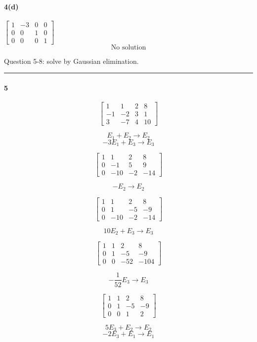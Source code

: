 \documentclass[a4paper,11pt,twoside]{report}
\begin{document}
\paragraph{4(d)}
$\begin{bmatrix}  1 & -3 & 0 & 0 \\ 0 & 0 & 1 & 0 \\ 0 & 0 & 0 & 1  \end{bmatrix} $
\[\boxed{\:\text{No solution}\:}\]

\noindent Question 5-8: solve by Gaussian elimination. \\ \hrule

\paragraph{5}

\[\begin{bmatrix} 1 & 1 & 2 & 8 \\ -1 & -2 & 3 & 1 \\ 3 & -7 & 4 & 10 \end{bmatrix} \]

\[E_1 + E_2 \to E_2\]
\[-3E_1 + E_3 \to E_3\]

\[\begin{bmatrix} 1 & 1 & 2 & 8 \\ 0 & -1 & 5 & 9 \\ 0 & -10 & -2 & -14 \end{bmatrix} \]

\[-E_2 \to E_2\]

\[\begin{bmatrix} 1 & 1 & 2 & 8 \\ 0 & 1 & -5 & -9 \\ 0 & -10 & -2 & -14 \end{bmatrix} \]

\[10E_2 + E_3 \to E_3\]

\[\begin{bmatrix} 1 & 1 & 2 & 8 \\ 0 & 1 & -5 & -9 \\ 0 & 0 & -52 & -104 \end{bmatrix} \]

\[-\frac{1}{52}E_3 \to E_3\]

\[\begin{bmatrix} 1 & 1 & 2 & 8 \\ 0 & 1 & -5 & -9 \\ 0 & 0 & 1 & 2 \end{bmatrix} \]

\[5E_3 + E_2 \to E_2\]
\[-2 E_3 + E_1 \to E_1\]
\end{document}
